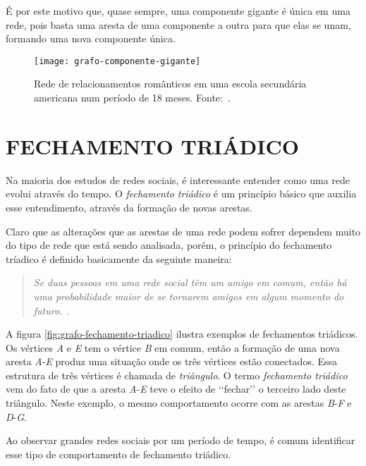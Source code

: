 É por este motivo que, quase sempre, uma componente gigante é única em uma rede, pois basta uma aresta de uma componente a outra para que elas se unam, formando uma nova componente única.

\begin{figure}[H]
\texttt{[image: grafo-componente-gigante]}
\centering
\caption{
    Rede de relacionamentos românticos em uma escola secundária americana num período de 18 meses. Fonte:~\cite{bearman2004chains}.
}
\label{fig:grafo-componente-gigante}
\end{figure}

\section{\texorpdfstring{\MakeUppercase{Fechamento Triádico}}{}}
\label{conceitos__fechamento-triadico}

Na maioria dos estudos de redes sociais, é interessante entender como uma rede evolui através do tempo. O \emph{fechamento triádico} é um princípio básico que auxilia esse entendimento, através da formação de novas arestas.

Claro que as alterações que as arestas de uma rede podem sofrer dependem muito do tipo de rede que está sendo analisada, porém, o princípio do fechamento tríadico é definido basicamente da seguinte maneira:

\begin{quotation}
    \emph{Se duas pessoas em uma rede social têm um amigo em comum, então há uma probabilidade maior de se tornarem amigos em algum momento do futuro}.~\cite{rapoport1953spread}.
\end{quotation}

A figura \ref{fig:grafo-fechamento-triadico} ilustra exemplos de fechamentos triádicos. Os vértices \emph{A} e \emph{E} tem o vértice \emph{B} em comum, então a formação de uma nova aresta \emph{A}-\emph{E} produz uma situação onde os três vértices estão conectados. Essa estrutura de três vértices é chamada de \emph{triângulo}. O termo \emph{fechamento triádico} vem do fato de que a aresta \emph{A}-\emph{E} teve o efeito de ‘‘fechar’’ o terceiro lado deste triângulo. Neste exemplo, o mesmo comportamento ocorre com as arestas \emph{B}-\emph{F} e \emph{D}-\emph{G}.

Ao observar grandes redes sociais por um período de tempo, é comum identificar esse tipo de comportamento de fechamento triádico.

